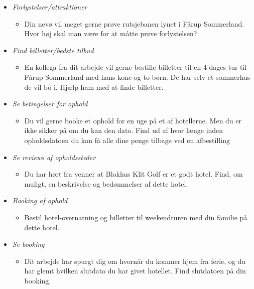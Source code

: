 \documentclass[10pt,a4paper]{article}      %
\begin{document}
\begin{itemize}
\item {\it Forlystelser/attraktioner}
    \begin{itemize}
    \item Din nevø vil meget gerne prøve rutsjebanen lynet i Fårup Sommerland.
    Hvor høj skal man være for at måtte prøve forlystelsen?
    \end{itemize}

\item {\it Find billetter/bedste tilbud}
    \begin{itemize}
    \item En kollega fra dit arbejde vil gerne bestille billetter til en
    4-dages tur til Fårup Sommerland med hans kone og to børn. De har selv et
    sommerhus de vil bo i. Hjælp ham med at finde billetter.
    \end{itemize}

\item {\it Se betingelser for ophold}
    \begin{itemize}
    \item Du vil gerne booke et ophold for en uge på et af hotellerne. Men du
    er ikke sikker på om du kan den dato. Find ud af hvor længe inden opholdsdatoen
    du kan få alle dine penge tilbage ved en afbestilling
    \end{itemize}

\item {\it Se reviews af opholdssteder}
    \begin{itemize}
    \item Du har hørt fra venner at Blokhus Klit Golf er et godt hotel. Find,
    om muligt, en beskrivelse og bedømmelser af dette hotel.
    \end{itemize}

\item {\it Booking af ophold}
    \begin{itemize}
    \item Bestil hotel-overnatning og billetter til weekendturen med din
    familie på dette hotel.
    \end{itemize}

\item {\it Se booking}
    \begin{itemize}
    \item Dit arbejde har spurgt dig om hvornår du kommer hjem fra ferie, og du
    har glemt hvilken slutdato du har givet hotellet. Find slutdatoen på din
    booking.
    \end{itemize}


\end{itemize}
\end{document}
